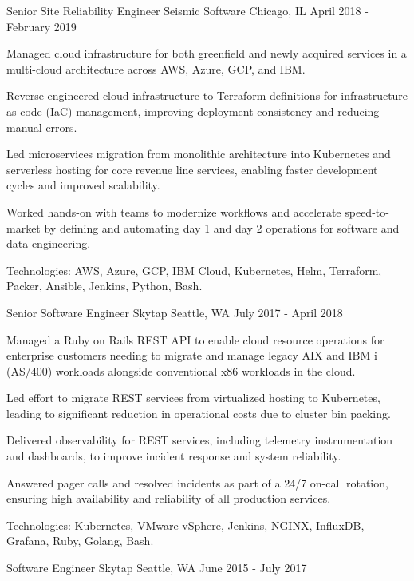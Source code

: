 \begin{cventries}
  \cventry
    {Senior Site Reliability Engineer} %
    {Seismic Software} %
    {Chicago, IL} %
    {April 2018 - February 2019} %
    {
      \begin{cvitems} %
        \item {Managed cloud infrastructure for both greenfield and newly acquired services in a multi-cloud architecture across AWS, Azure, GCP, and IBM.}
        \item {Reverse engineered cloud infrastructure to Terraform definitions for infrastructure as code (IaC) management, improving deployment consistency and reducing manual errors.}
        \item {Led microservices migration from monolithic architecture into Kubernetes and serverless hosting for core revenue line services, enabling faster development cycles and improved scalability.}
        \item {Worked hands-on with teams to modernize workflows and accelerate speed-to-market by defining and automating day 1 and day 2 operations for software and data engineering.}
        \item {Technologies: AWS, Azure, GCP, IBM Cloud, Kubernetes, Helm, Terraform, Packer, Ansible, Jenkins, Python, Bash.}
      \end{cvitems}
    }

  \cventry
    {Senior Software Engineer} %
    {Skytap} %
    {Seattle, WA} %
    {July 2017 - April 2018} %
    {
      \begin{cvitems} %
        \item {Managed a Ruby on Rails REST API to enable cloud resource operations for enterprise customers needing to migrate and manage legacy AIX and IBM i (AS/400) workloads alongside conventional x86 workloads in the cloud.}
        \item {Led effort to migrate REST services from virtualized hosting to Kubernetes, leading to significant reduction in operational costs due to cluster bin packing.}
        \item {Delivered observability for REST services, including telemetry instrumentation and dashboards, to improve incident response and system reliability.}
        \item {Answered pager calls and resolved incidents as part of a 24/7 on-call rotation, ensuring high availability and reliability of all production services.}
        \item {Technologies: Kubernetes, VMware vSphere, Jenkins, NGINX, InfluxDB, Grafana, Ruby, Golang, Bash.}
      \end{cvitems}
    }

  \cventry
    {Software Engineer} %
    {Skytap} %
    {Seattle, WA} %
    {June 2015 - July 2017} %
    {}

\end{cventries}
